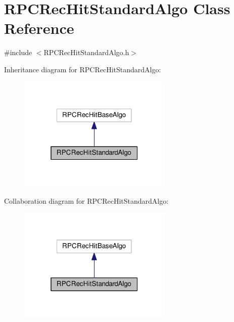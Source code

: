 \hypertarget{classRPCRecHitStandardAlgo}{\section{R\-P\-C\-Rec\-Hit\-Standard\-Algo Class Reference}
\label{classRPCRecHitStandardAlgo}
}


{\ttfamily \#include $<$R\-P\-C\-Rec\-Hit\-Standard\-Algo.\-h$>$}



Inheritance diagram for R\-P\-C\-Rec\-Hit\-Standard\-Algo\-:\nopagebreak
\begin{figure}[H]
\begin{center}
\leavevmode
\includegraphics[width=208pt]{classRPCRecHitStandardAlgo__inherit__graph}
\end{center}
\end{figure}


Collaboration diagram for R\-P\-C\-Rec\-Hit\-Standard\-Algo\-:\nopagebreak
\begin{figure}[H]
\begin{center}
\leavevmode
\includegraphics[width=208pt]{classRPCRecHitStandardAlgo__coll__graph}
\end{center}
\end{figure}
